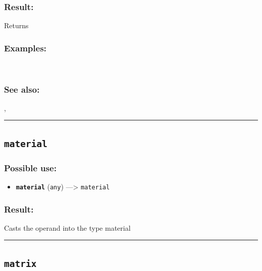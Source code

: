 \documentclass[]{book}
\providecommand{\tightlist}{%
  \setlength{\itemsep}{0pt}\setlength{\parskip}{0pt}}
\theoremstyle{definition}
\theoremstyle{definition}
\theoremstyle{definition}
\theoremstyle{remark}
\begin{document}
\subsubsection{Result:}\label{result-324}

Returns

\subsubsection{Examples:}\label{examples-232}

\begin{verbatim}
 
\end{verbatim}

\subsubsection{See also:}\label{see-also-132}

\href{operators-s-to-z.html\#}{},

\begin{center}\rule{0.5\linewidth}{\linethickness}\end{center}

\subsection{\texorpdfstring{\texttt{material}}{material}}\label{material-2}

\subsubsection{Possible use:}\label{possible-use-336}

\begin{itemize}
\tightlist
\item
  \textbf{\texttt{material}} (\texttt{any}) ---\textgreater{}
  \texttt{material}
\end{itemize}

\subsubsection{Result:}\label{result-325}

Casts the operand into the type material

\begin{center}\rule{0.5\linewidth}{\linethickness}\end{center}

\subsection{\texorpdfstring{\texttt{matrix}}{matrix}}\label{matrix}
\end{document}
